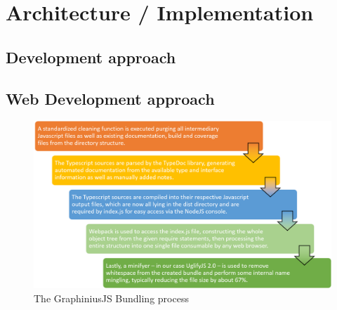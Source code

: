 \chapter{Architecture / Implementation}
\label{ch:implementation}


\section{Development approach}
\label{sect:dev_approach}


	
	
\section{Web Development approach}
\label{sect:webdev_approach}


\begin{figure}[ht]
	\label{fig_js_bundling}
	\hspace*{-0.5cm}
	\includegraphics[width=1.1\textwidth]{figures/bundle_process}
	\caption{The GraphiniusJS Bundling process}
\end{figure}



